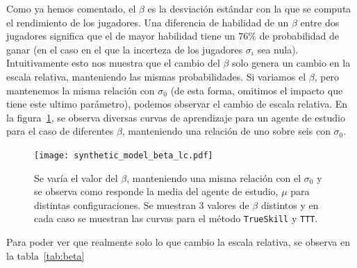 \documentclass[11pt,twoside,spanish]{report} %
\begin{document}
Como ya hemos comentado, el $\beta$ es la desviaci\'on est\'andar con la que se computa el rendimiento de los jugadores.
Una diferencia de habilidad de un $\beta$ entre dos jugadores significa que el de mayor habilidad tiene un $76\%$ de probabilidad de ganar (en el caso en el que la incerteza de los jugadores $\sigma_i$ sea nula).
Intuitivamente esto nos muestra que el cambio del $\beta$ solo genera un cambio en la escala relativa, manteniendo las mismas probabilidades.
Si variamos el $\beta$, pero mantenemos la misma relaci\'on con $\sigma_0$ (de esta forma, omitimos el impacto que tiene este ultimo par\'ametro), podemos observar el cambio de escala relativa.
En la figura~\ref{fig:beta_lc}, se observa diversas curvas de aprendizaje para un agente de estudio para el caso de diferentes $\beta$, manteniendo una relaci\'on de uno sobre seis con $\sigma_0$.


\begin{figure}[H]
	\centering
	\texttt{[image: synthetic\_model\_beta\_lc.pdf]}
	\caption{Se var\'ia el valor del $\beta$, manteniendo una misma relaci\'on con el $\sigma_0$ y se observa como responde la media del agente de estudio, $\mu$ para distintas configuraciones. Se muestran 3 valores de $\beta$ distintos y en cada caso se muestran las curvas para el m\'etodo \texttt{TrueSkill} y \texttt{TTT}.}
	\label{fig:beta_lc}
\end{figure}




Para poder ver que realmente solo lo que cambio la escala relativa, se observa en la tabla~\ref{tab:beta}
\end{document}
